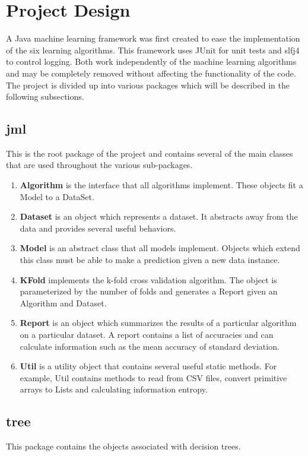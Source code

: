 \documentclass[11pt]{article}
\newcommand{\bb}{\textbf}
\begin{document}
\section{Project Design}
A Java machine learning framework was first created to ease the implementation of the six learning algorithms. This framework uses JUnit for unit tests and slfj4 to control logging. Both work independently of the machine learning algorithms and may be completely removed without affecting the functionality of the code. The project is divided up into various packages which will be described in the following subsections.

\subsection{jml}
This is the root package of the project and contains several of the main classes that are used throughout the various sub-packages.

\begin{enumerate}[leftmargin=*]
  \item[] \bb{Algorithm} is the interface that all algorithms implement. These objects fit a Model to a DataSet.
  \item[] \bb{Dataset} is an object which represents a dataset. It abstracts away from the data and provides several useful behaviors.
  \item[] \bb{Model} is an abstract class that all models implement. Objects which extend this class must be able to make a prediction given a new data instance.
  \item[] \bb{KFold} implements the k-fold cross validation algorithm. The object is parameterized by the number of folds and generates a Report given an Algorithm and Dataset.
  \item[] \bb{Report} is an object which summarizes the results of a particular algorithm on a particular dataset. A report contains a list of accuracies and can calculate information such as the mean accuracy of standard deviation.
  \item[] \bb{Util} is a utility object that contains several useful static methods. For example, Util contains methods to read from CSV files, convert primitive arrays to Lists and calculating information entropy.
\end{enumerate}

\subsection{tree}
This package contains the objects associated with decision trees.
\end{document}
